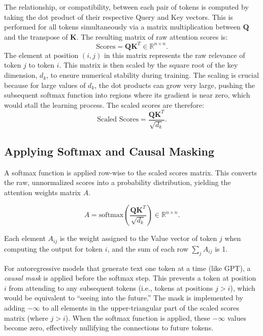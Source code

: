 \documentclass[%
  reprint,
  superscriptaddress,
  showpacs,
  showkeys,
  amsmath,amssymb,
  pra,
  longbibliography,
  floatfix,
  x11names
]{revtex4-2}
\begin{document}
The relationship, or compatibility, between each pair of tokens is computed by taking the dot product of their respective Query and Key vectors. This is performed for all tokens simultaneously via a matrix multiplication between $\bm{Q}$ and the transpose of $\bm{K}$. The resulting matrix of raw attention scores is:
\begin{equation}
    \text{Scores} = \bm{Q} \bm{K}^T \in \mathbb{R}^{n \times n}.
\end{equation}
The element at position $(i,j)$ in this matrix represents the raw relevance of token $j$ to token $i$.
This matrix is then scaled by the square root of the key dimension, $d_k$,
to ensure numerical stability during training.
The scaling is crucial because for large values of $d_k$, the dot products can grow very large,
pushing the subsequent softmax function into regions where its gradient is near zero, which would stall the learning process.
The scaled scores are therefore:
\begin{equation}
    \text{Scaled Scores} = \frac{\bm{Q} \bm{K}^T}{\sqrt{d_k}}.
\end{equation}


\subsection{Applying Softmax and Causal Masking}

A softmax function is applied row-wise to the scaled scores matrix. This converts the raw, unnormalized scores into a probability distribution, yielding the attention weights matrix $A$.

\begin{equation}
    A = \text{softmax}\left(\frac{\bm{Q} \bm{K}^T}{\sqrt{d_k}}\right) \in \mathbb{R}^{n \times n}.
\end{equation}

Each element $A_{ij}$ is the weight assigned to the Value vector of token $j$ when computing the output for token $i$, and the sum of each row $\sum_j A_{ij}$ is 1.

For autoregressive models that generate text one token at a time (like GPT), a \textit{causal mask} is applied before the softmax step. This prevents a token at position $i$ from attending to any subsequent tokens (i.e., tokens at positions $j > i$), which would be equivalent to ``seeing into the future.'' The mask is implemented by adding $-\infty$ to all elements in the upper-triangular part of the scaled scores matrix (where $j>i$). When the softmax function is applied, these $-\infty$ values become zero, effectively nullifying the connections to future tokens.
\end{document}

